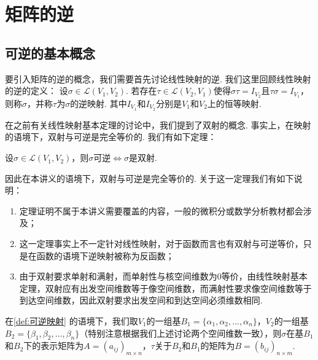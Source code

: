 \section{矩阵的逆}

\subsection{可逆的基本概念}

要引入矩阵的逆的概念，我们需要首先讨论线性映射的逆. 我们这里回顾线性映射的逆的定义：
设$\sigma \in \mathcal{L}(V_1,V_2)$. 若存在$\tau \in \mathcal{L}(V_2,V_1)$使得$\sigma \tau = I_{V_2}$且$\tau \sigma = I_{V_1}$，则称$\sigma$，并称$\tau$为$\sigma$的逆映射. 其中$I_{V_1}$和$I_{V_2}$分别是$V_1$和$V_2$上的恒等映射.


在之前有关线性映射基本定理的讨论中，我们提到了双射的概念. 事实上，在映射的语境下，双射与可逆是完全等价的. 我们有如下定理：
\begin{theorem}{}{}
    设$\sigma \in \mathcal{L}(V_1,V_2)$，则$\sigma$可逆$\iff \sigma$是双射.
\end{theorem}

因此在本讲义的语境下，双射与可逆是完全等价的. 关于这一定理我们有如下说明：
\begin{enumerate}
    \item 定理证明不属于本讲义需要覆盖的内容，一般的微积分或数学分析教材都会涉及；

    \item 这一定理事实上不一定针对线性映射，对于函数而言也有双射与可逆等价，只是在函数的语境下逆映射被称为反函数；

    \item 由于双射要求单射和满射，而单射性与核空间维数为0等价，由线性映射基本定理，双射应有出发空间维数等于像空间维数，而满射性要求像空间维数等于到达空间维数，因此双射要求出发空间和到达空间必须维数相同.
\end{enumerate}

在\autoref{def:可逆映射} 的语境下，我们取$V_1$的一组基$B_1=\{\alpha_1,\alpha_2,\ldots,\alpha_n\}$，$V_2$的一组基$B_2=\{\beta_1,\beta_2,\ldots,\beta_n\}$（特别注意根据我们上述讨论两个空间维数一致），则$\sigma$在基$B_1$和$B_2$下的表示矩阵为$A=(a_{ij})_{m \times n}$，$\tau$关于$B_2$和$B_1$的矩阵为$B=(b_{ij})_{n \times m}$.

